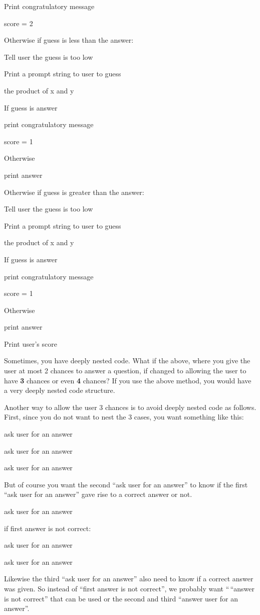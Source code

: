 \documentclass[
]{article}
\begin{document}
Print congratulatory message

score = 2

Otherwise if guess is less than the answer:

Tell user the guess is too low

Print a prompt string to user to guess

the product of x and y

If guess is answer

print congratulatory message

score = 1

Otherwise

print answer

Otherwise if guess is greater than the answer:

Tell user the guess is too low

Print a prompt string to user to guess

the product of x and y

If guess is answer

print congratulatory message

score = 1

Otherwise

print answer

Print user's score

Sometimes, you have deeply nested code. What if the above, where you
give the user at most 2 chances to answer a question, if changed to
allowing the user to have \textbf{3} chances or even \textbf{4} chances?
If you use the above method, you would have a very deeply nested code
structure.

Another way to allow the user 3 chances is to avoid deeply nested code
as follows. First, since you do not want to nest the 3 cases, you want
something like this:

ask user for an answer

ask user for an answer

ask user for an answer

But of course you want the second ``ask user for an answer'' to know if
the first ``ask user for an answer'' gave rise to a correct answer or
not.

ask user for an answer

if first answer is not correct:

ask user for an answer

ask user for an answer

Likewise the third ``ask user for an answer'' also need to know if a
correct answer was given. So instead of ``first answer is not correct'',
we probably want ``\,``answer is not correct'' that can be used or the
second and third ``answer user for an answer''.
\end{document}
